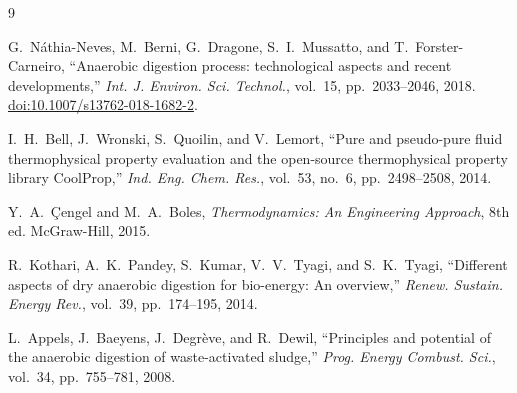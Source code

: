 \documentclass[12pt, letterpaper]{article}
\begin{document}
\begin{thebibliography}{9}

G.~N\'{a}thia-Neves, M.~Berni, G.~Dragone, S.~I.~Mussatto, and T.~Forster-Carneiro,
``Anaerobic digestion process: technological aspects and recent developments,''
\textit{Int. J. Environ. Sci. Technol.}, vol.~15, pp.~2033--2046, 2018.
\newblock \href{https://doi.org/10.1007/s13762-018-1682-2}{doi:10.1007/s13762-018-1682-2}.

I.~H.~Bell, J.~Wronski, S.~Quoilin, and V.~Lemort,
``Pure and pseudo-pure fluid thermophysical property evaluation and the open-source thermophysical property library CoolProp,''
\textit{Ind. Eng. Chem. Res.}, vol.~53, no.~6, pp.~2498--2508, 2014.

Y.~A.~\c{C}engel and M.~A.~Boles,
\textit{Thermodynamics: An Engineering Approach}, 8th ed.
McGraw-Hill, 2015.

R.~Kothari, A.~K.~Pandey, S.~Kumar, V.~V.~Tyagi, and S.~K.~Tyagi,
``Different aspects of dry anaerobic digestion for bio-energy: An overview,''
\textit{Renew. Sustain. Energy Rev.}, vol.~39, pp.~174--195, 2014.

L.~Appels, J.~Baeyens, J.~Degr\`{e}ve, and R.~Dewil,
``Principles and potential of the anaerobic digestion of waste-activated sludge,''
\textit{Prog. Energy Combust. Sci.}, vol.~34, pp.~755--781, 2008.

\end{thebibliography}
\end{document}
